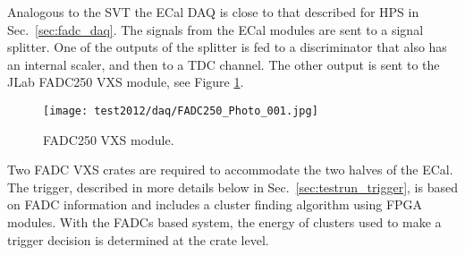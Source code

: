 Analogous to the SVT the ECal DAQ is close to that described for HPS in Sec.~\ref{sec:fadc_daq}. 
The signals from the ECal modules are sent to a signal splitter. One of the outputs of the splitter is fed to a 
discriminator that also has an internal scaler, and then to a TDC channel. The other output is sent to the 
JLab FADC250 VXS module, see Figure \ref{fig:testrun_fadc}. 
\begin{figure}[]
\texttt{[image: test2012/daq/FADC250\_Photo\_001.jpg]}
\caption{\small{FADC250 VXS module.}}\label{fig:testrun_fadc}
\end{figure}
Two FADC VXS crates are required to 
accommodate the two halves of the ECal. The trigger, described in more details below in 
Sec.~\ref{sec:testrun_trigger}, is based on FADC information and includes a cluster finding algorithm 
using FPGA modules. With the FADCs based system, the energy of clusters used to make a trigger 
decision is determined at the crate level. 
